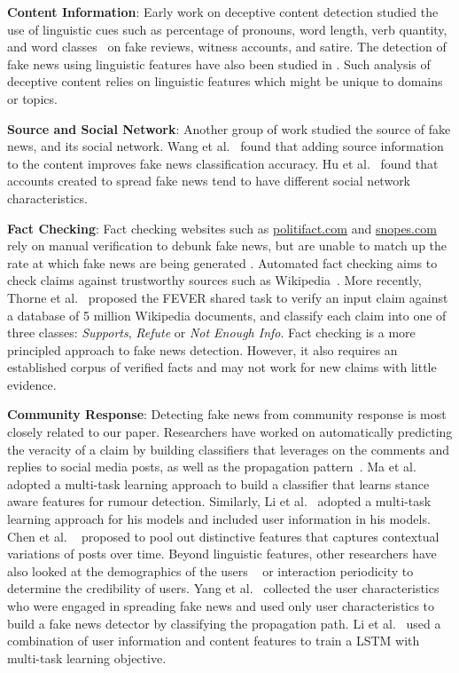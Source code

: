 \documentclass[letterpaper]{article} %
\begin{document}
\textbf{Content Information}: Early work on deceptive content detection studied the use of linguistic cues such as percentage of pronouns, word length, verb quantity, and word classes~\cite{fuller09,mihalcea09,ott11,rubin16} on fake reviews, witness accounts, and satire. The detection of fake news using linguistic features have also been studied in \cite{obrien18,wang17liar}. Such analysis of deceptive content relies on linguistic features which might be unique to domains or topics.

\textbf{Source and Social Network}:
Another group of work studied the source of fake news, and its social network. Wang et al.~ found that adding source information to the content improves fake news classification accuracy. Hu et al.~ found that accounts created to spread fake news tend to have different social network characteristics.

\textbf{Fact Checking}:
Fact checking websites such as \url{politifact.com} and \url{snopes.com} rely on manual verification to debunk fake news, but are unable to match up the rate at which fake news are being generated \cite{poynter_2019}. Automated fact checking aims to check claims against trustworthy sources such as Wikipedia~\cite{giovanni15}.  More recently, Thorne et al.~ proposed the FEVER shared task to verify an input claim against a database of 5 million Wikipedia documents, and classify each claim into one of three classes: \textit{Supports}, \textit{Refute} or \textit{Not Enough Info}. Fact checking is a more principled approach to fake news detection. However, it also requires an established corpus of verified facts and may not work for new claims with little evidence.

\textbf{Community Response}:
Detecting fake news from community response is most closely related to our paper. Researchers have worked on automatically predicting the veracity of a claim by building classifiers that leverages on the comments and replies to social media posts, as well as the propagation pattern~\cite{omar17,castillo11,ma17,ma18}. Ma et al.~ adopted a multi-task learning approach to build a classifier that learns stance aware features for rumour detection. Similarly, Li et al.~ adopted a multi-task learning approach for his models and included user information in his models. Chen et al. ~ proposed to pool out distinctive features that captures contextual variations of posts over time. Beyond linguistic features, other researchers have also looked at the demographics of the users ~\cite{yang12,li-etal-2019-rumor} or interaction periodicity \cite{kwon13a} to determine the credibility of users. Yang et al.~ collected the user characteristics who were engaged in spreading fake news and used only user characteristics to build a fake news detector by classifying the propagation path. Li et al.~ used a combination of user information and content features to train a LSTM with multi-task learning objective.
\end{document}
